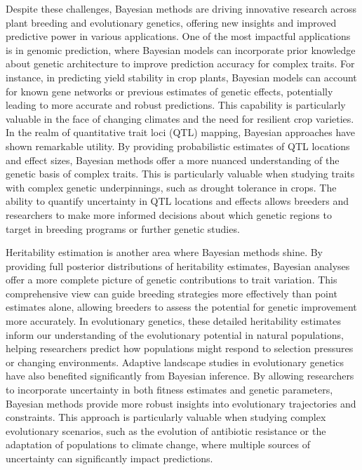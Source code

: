 \documentclass[12pt,a4paper]{article}
\begin{document}
Despite these challenges, Bayesian methods are driving innovative research across plant breeding and evolutionary genetics, offering new insights and improved predictive power in various applications. One of the most impactful applications is in genomic prediction, where Bayesian models can incorporate prior knowledge about genetic architecture to improve prediction accuracy for complex traits. For instance, in predicting yield stability in crop plants, Bayesian models can account for known gene networks or previous estimates of genetic effects, potentially leading to more accurate and robust predictions. This capability is particularly valuable in the face of changing climates and the need for resilient crop varieties. In the realm of quantitative trait loci (QTL) mapping, Bayesian approaches have shown remarkable utility. By providing probabilistic estimates of QTL locations and effect sizes, Bayesian methods offer a more nuanced understanding of the genetic basis of complex traits. This is particularly valuable when studying traits with complex genetic underpinnings, such as drought tolerance in crops. The ability to quantify uncertainty in QTL locations and effects allows breeders and researchers to make more informed decisions about which genetic regions to target in breeding programs or further genetic studies.

Heritability estimation is another area where Bayesian methods shine. By providing full posterior distributions of heritability estimates, Bayesian analyses offer a more complete picture of genetic contributions to trait variation. This comprehensive view can guide breeding strategies more effectively than point estimates alone, allowing breeders to assess the potential for genetic improvement more accurately. In evolutionary genetics, these detailed heritability estimates inform our understanding of the evolutionary potential in natural populations, helping researchers predict how populations might respond to selection pressures or changing environments. Adaptive landscape studies in evolutionary genetics have also benefited significantly from Bayesian inference. By allowing researchers to incorporate uncertainty in both fitness estimates and genetic parameters, Bayesian methods provide more robust insights into evolutionary trajectories and constraints. This approach is particularly valuable when studying complex evolutionary scenarios, such as the evolution of antibiotic resistance or the adaptation of populations to climate change, where multiple sources of uncertainty can significantly impact predictions.
\end{document}

